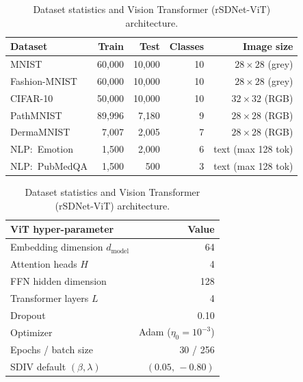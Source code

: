 
\begin{table}[t]
\centering
\caption{Dataset statistics and Vision Transformer (rSDNet-ViT) architecture.}
\label{tab:datasets}
\small
\begin{tabular}{@{}lrrrr@{}}
\toprule
\textbf{Dataset} & \textbf{Train} & \textbf{Test} & \textbf{Classes} & \textbf{Image size} \\
\midrule
MNIST               & 60{,}000 & 10{,}000 & 10 & $28\times28$ (grey) \\
Fashion-MNIST       & 60{,}000 & 10{,}000 & 10 & $28\times28$ (grey) \\
CIFAR-10            & 50{,}000 & 10{,}000 & 10 & $32\times32$ (RGB)  \\
PathMNIST           & 89{,}996 &  7{,}180 &  9 & $28\times28$ (RGB)  \\
DermaMNIST          &  7{,}007 &  2{,}005 &  7 & $28\times28$ (RGB)  \\
NLP:~Emotion        &  1{,}500 &  2{,}000 &  6 & text (max 128 tok) \\
NLP:~PubMedQA       &  1{,}500 &    500   &  3 & text (max 128 tok) \\
\bottomrule
\end{tabular}

\vspace{6pt}

\begin{tabular}{@{}lr@{}}
\toprule
\textbf{ViT hyper-parameter} & \textbf{Value} \\
\midrule
Embedding dimension $d_\text{model}$  & 64   \\
Attention heads $H$                   & 4    \\
FFN hidden dimension                  & 128  \\
Transformer layers $L$                & 4    \\
Dropout                               & 0.10 \\
Optimizer                             & Adam ($\eta_0{=}10^{-3}$) \\
Epochs / batch size                   & 30 / 256 \\
SDIV default $(\beta,\lambda)$         & $(0.05,\,-0.80)$ \\
\bottomrule
\end{tabular}
\end{table}
